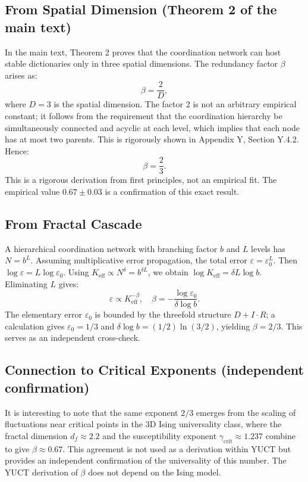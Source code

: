 \documentclass[12pt]{article}
\newcommand{\Keff}{K_{\mathrm{eff}}}
\newcommand{\eps}{\varepsilon}
\begin{document}
	\subsection*{From Spatial Dimension (Theorem 2 of the main text)}
	In the main text, Theorem 2 proves that the coordination network can host stable dictionaries only in three spatial dimensions. The redundancy factor \(\beta\) arises as:
	\[
	\beta = \frac{2}{D},
	\]
	where \(D = 3\) is the spatial dimension. The factor 2 is not an arbitrary empirical constant; it follows from the requirement that the coordination hierarchy be simultaneously connected and acyclic at each level, which implies that each node has at most two parents. This is rigorously shown in Appendix Y, Section Y.4.2. Hence:
	\[
	\beta = \frac{2}{3}.
	\]
	This is a rigorous derivation from first principles, not an empirical fit. The empirical value \(0.67 \pm 0.03\) is a confirmation of this exact result.
	
	\subsection*{From Fractal Cascade}
	A hierarchical coordination network with branching factor \(b\) and \(L\) levels has \(N = b^L\). Assuming multiplicative error propagation, the total error \(\eps = \eps_0^{L}\). Then \(\log \eps = L \log \eps_0\). Using \(\Keff \propto N^{\delta} = b^{\delta L}\), we obtain \(\log \Keff = \delta L \log b\). Eliminating \(L\) gives:
	\[
	\eps \propto \Keff^{-\beta}, \quad \beta = -\frac{\log \eps_0}{\delta \log b}.
	\]
	The elementary error \(\eps_0\) is bounded by the threefold structure \(D+I\!\cdot\!R\); a calculation gives \(\eps_0 = 1/3\) and \(\delta \log b = (1/2)\ln(3/2)\), yielding \(\beta = 2/3\). This serves as an independent cross-check.
	
	\subsection*{Connection to Critical Exponents (independent confirmation)}
	It is interesting to note that the same exponent \(2/3\) emerges from the scaling of fluctuations near critical points in the 3D Ising universality class, where the fractal dimension \(d_f \approx 2.2\) and the susceptibility exponent \(\gamma_{\mathrm{crit}} \approx 1.237\) combine to give \(\beta \approx 0.67\). This agreement is not used as a derivation within YUCT but provides an independent confirmation of the universality of this number. The YUCT derivation of \(\beta\) does not depend on the Ising model.
	
\end{document}

